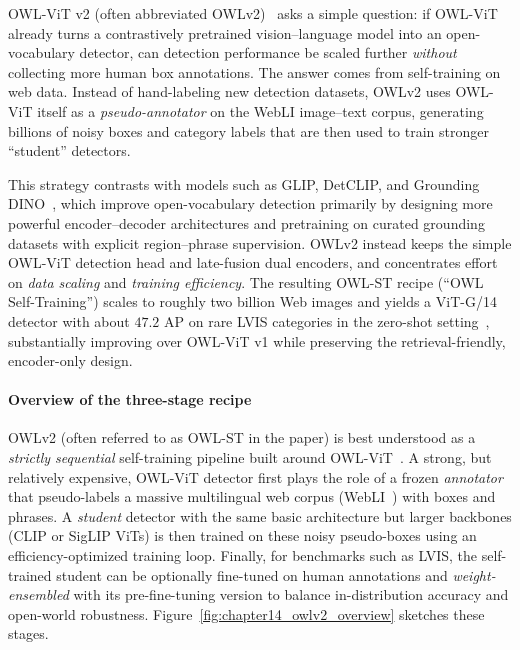 \begin{enrichment}
	\label{enr:chapter14_owlv2}
	
	\begin{enrichment}
		OWL-ViT v2 (often abbreviated OWLv2)~\cite{minderer2024_owlvitv2} asks a simple question: if OWL-ViT already turns a contrastively pretrained vision--language model into an open-vocabulary detector, can detection performance be scaled further \emph{without} collecting more human box annotations.
		The answer comes from self-training on web data.
		Instead of hand-labeling new detection datasets, OWLv2 uses OWL-ViT itself as a \emph{pseudo-annotator} on the WebLI image--text corpus, generating billions of noisy boxes and category labels that are then used to train stronger ``student'' detectors.
		
		This strategy contrasts with models such as GLIP, DetCLIP, and Grounding DINO~\cite{li2022_glip,zhong2021_regionclip,liu2023_groundingdino}, which improve open-vocabulary detection primarily by designing more powerful encoder--decoder architectures and pretraining on curated grounding datasets with explicit region--phrase supervision.
		OWLv2 instead keeps the simple OWL-ViT detection head and late-fusion dual encoders, and concentrates effort on \emph{data scaling} and \emph{training efficiency}.
		The resulting OWL-ST recipe (``OWL Self-Training'') scales to roughly two billion Web images and yields a ViT-G/14 detector with about \(47.2\) AP on rare LVIS categories in the zero-shot setting~\cite{minderer2024_owlvitv2}, substantially improving over OWL-ViT v1 while preserving the retrieval-friendly, encoder-only design.
	\end{enrichment}
	
	\begin{enrichment}
		
		\paragraph{Overview of the three-stage recipe}
		OWLv2 (often referred to as OWL-ST in the paper) is best understood as a \emph{strictly sequential} self-training pipeline built around OWL-ViT~\cite{minderer2022_owlvit}.
		A strong, but relatively expensive, OWL-ViT detector first plays the role of a frozen \emph{annotator} that pseudo-labels a massive multilingual web corpus (WebLI~\cite{jia2021_scalingvision}) with boxes and phrases.
		A \emph{student} detector with the same basic architecture but larger backbones (CLIP or SigLIP ViTs) is then trained on these noisy pseudo-boxes using an efficiency-optimized training loop.
		Finally, for benchmarks such as LVIS, the self-trained student can be optionally fine-tuned on human annotations and \emph{weight-ensembled} with its pre-fine-tuning version to balance in-distribution accuracy and open-world robustness.
		Figure~\ref{fig:chapter14_owlv2_overview} sketches these stages.
		

\end{enrichment}
\end{enrichment}
